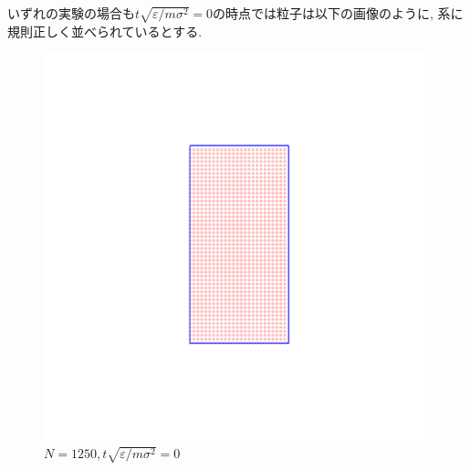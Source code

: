 いずれの実験の場合も$t\sqrt{\varepsilon/m{\sigma}^2}=0$の時点では粒子は以下の画像のように, 系に規則正しく並べられているとする.

\begin{figure}[H]
  \centering
  \includegraphics[scale=0.2]{image/initial1250.png}
  \caption{$N=1250, t\sqrt{\varepsilon/m{\sigma}^2}=0$}
  \label{}
\end{figure}





